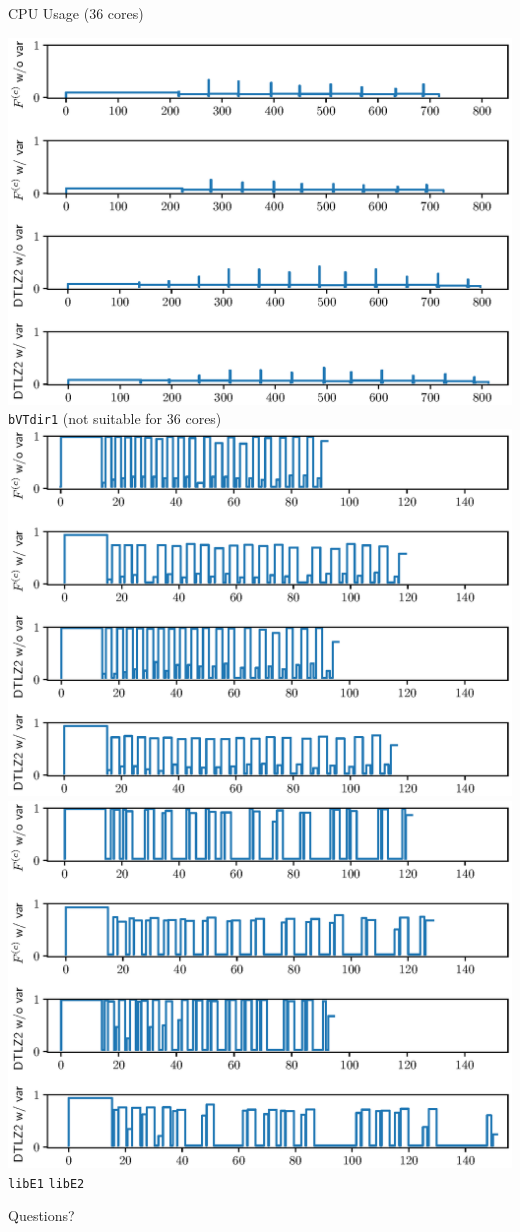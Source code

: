 \documentclass[xcolor=dvipsnames]{beamer}
\begin{document}
\begin{frame}{CPU Usage (36 cores)}
\begin{center}
\includegraphics[width=.4\textwidth]{vtdir_cpu_plt.eps}\\
{\small {\tt bVTdir1} (not suitable for $36$ cores)}\\
\includegraphics[width=.4\textwidth]{libe1_cpu_plt.eps}\hskip 20pt
\includegraphics[width=.4\textwidth]{libe2_cpu_plt.eps}\\
{\small\hskip 10pt {\tt libE1} \hskip 130pt {\tt libE2}}
\end{center}
\end{frame}
\begin{frame}{Questions?}
\tableofcontents
\end{frame}
\end{document}
